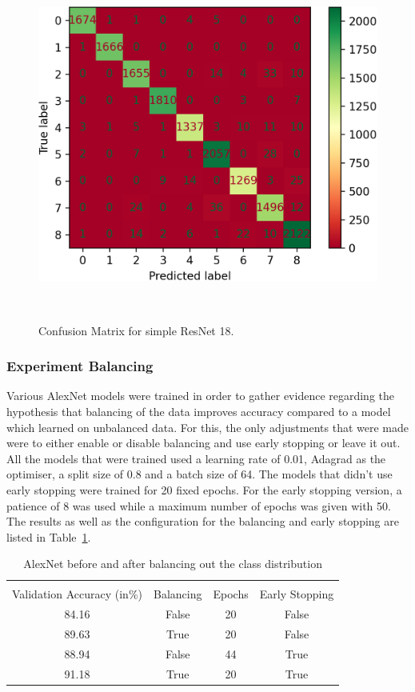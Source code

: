 \begin{figure}[ht]
	\centering
	\includegraphics[scale=0.6]{./figures/model_1_no_balancing_conf_matrix_cropped.png}
	\caption{Confusion Matrix for simple ResNet 18.}~\label{fig:res18-confmatrix}
\end{figure}

\subsubsection{Experiment Balancing}\label{balancingexperiment}
Various AlexNet models were trained in order to gather evidence regarding the hypothesis that balancing of the data improves accuracy compared to a model which learned on unbalanced data. For this, the only adjustments that were made were to either enable or disable balancing and use early stopping or leave it out. All the models that were trained used a learning rate of 0.01, Adagrad as the optimiser, a split size of 0.8 and a batch size of 64. The models that didn't use early stopping were trained for 20 fixed epochs. For the early stopping version, a patience of 8 was used while a maximum number of epochs was given with 50. The results as well as the configuration for the balancing and early stopping are listed in Table~\ref{balancing-table}. 

\begin{table}[ht]
	\caption{AlexNet before and after balancing out the class distribution}\label{balancing-table}
	\centering
	\begin{tabular}{cccc}
		\toprule
		\multicolumn{3}{c}{} \\
		Validation Accuracy (in\%)    & Balancing     & Epochs    &Early Stopping     \\
		\midrule
		84.16    &    False    & 20    & False \\
		89.63    &    True    & 20    & False  \\
		88.94    &    False   & 44    & True \\
		91.18    &    True    & 20    & True \\
		\bottomrule
	\end{tabular}
\end{table}

